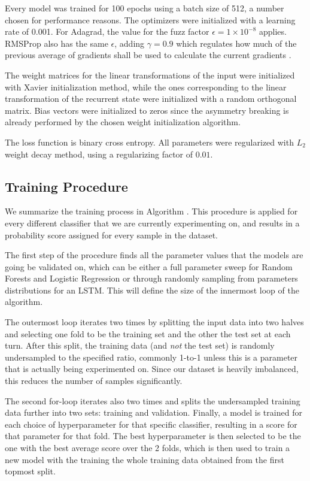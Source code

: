 \documentclass{kththesis}
\begin{document}
Every model was trained for 100 epochs using a batch size of 512, a number chosen for performance reasons. The optimizers were initialized with a learning rate of 0.001. For Adagrad, the value for the fuzz factor $\epsilon=1\times10^{-8}$ applies. RMSProp also has the same $\epsilon$, adding $\gamma=0.9$ which regulates how much of the previous average of gradients shall be used to calculate the current gradients .

The weight matrices for the linear transformations of the input were initialized with Xavier initialization method, while the ones corresponding to the linear transformation of the recurrent state were initialized with a random orthogonal matrix. Bias vectors were initialized to zeros since the asymmetry breaking is already performed by the chosen weight initialization algorithm.

The loss function is binary cross entropy. All parameters were regularized with $L_2$ weight decay method, using a regularizing factor of $0.01$.

\subsection{Training Procedure}

We summarize the training process in Algorithm . This procedure is applied for every different classifier that we are currently experimenting on, and results in a probability score assigned for every sample in the dataset.

The first step of the procedure finds all the parameter values that the models are going be validated on, which can be either a full parameter sweep for Random Forests and Logistic Regression or through randomly sampling from parameters distributions for an LSTM. This will define the size of the innermost loop of the algorithm. 

The outermost loop iterates two times by splitting the input data into two halves and selecting one fold to be the training set and the other the test set at each turn. After this split, the training data (and \emph{not} the test set) is randomly undersampled to the specified ratio, commonly 1-to-1 unless this is a parameter that is actually being experimented on. Since our dataset is heavily imbalanced, this reduces the number of samples significantly.

The second for-loop iterates also two times and splits the undersampled training data further into two sets: training and validation. Finally, a model is trained for each choice of hyperparameter for that specific classifier, resulting in a score for that parameter for that fold. The best hyperparameter is then selected to be the one with the best average score over the 2 folds, which is then used to train a new model with the training the whole training data obtained from the first topmost split.
\end{document}
